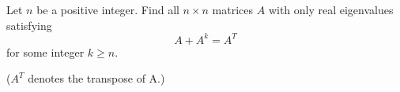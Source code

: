 \documentclass{article}
\begin{document}
\setlength{\parindent}{0pt}
Let $n$ be a positive integer. Find all $n \times n$ matrices $A$ with only real eigenvalues satisfying \[A + A^k = A^T\] for some integer $k \geq n$.

($A^T$ denotes the transpose of A.)


\end{document}
